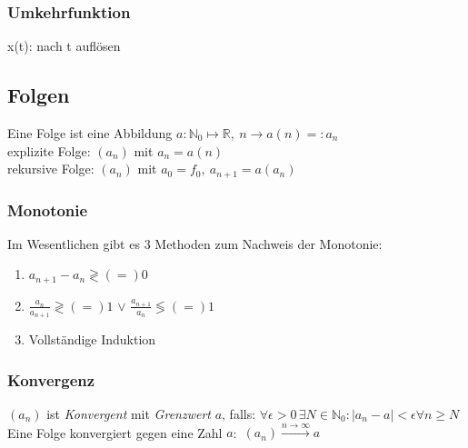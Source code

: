 \documentclass[6pt,a4paper]{scrartcl}
\newcommand{\abs}[1]{\ensuremath{\left\vert#1\right\vert}}
\newcommand{\N}{\ensuremath{\mathbb N}}
\newcommand{\R}{\ensuremath{\mathbb R}}
\begin{document}
\begin{multicols}{4}
\subsubsection{Umkehrfunktion}
x(t): nach t auflösen\\

\subsection{Folgen}
Eine Folge ist eine Abbildung $a: \N_0 \mapsto \R,\ n \rightarrow a(n) =: a_n$\\
explizite Folge: $(a_n)$ mit $a_n=a(n)$\\ rekursive Folge: $(a_n)$ mit $a_0=f_0,\  a_{n+1}=a(a_n)$\\

\subsubsection{Monotonie}
Im Wesentlichen gibt es 3 Methoden zum Nachweis der Monotonie:
\begin{enumerate}\itemsep0pt
\item $a_{n+1} - a_n \gtrless (=) 0$
\item $\frac{a_n}{a_{n+1}} \gtrless (=) 1$ \qquad $\lor$ \qquad $\frac{a_{n+1}}{a_n} \lessgtr (=) 1$
\item Vollständige Induktion
\end{enumerate}

\subsubsection{Konvergenz}
$(a_n)$ ist \emph{Konvergent} mit \emph{Grenzwert} $a$, falls: $\forall \epsilon > 0\, \exists N  \in \N_0:  \abs{a_n -a} < \epsilon  \forall n \ge N$\\
Eine Folge konvergiert gegen eine Zahl $a$:\ $(a_n) \overset{n \rightarrow \infty}{\longrightarrow} a$\\

\end{multicols}
\end{document}
